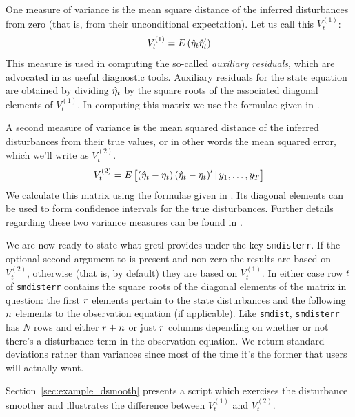One measure of variance is the mean square distance of the inferred
disturbances from zero (that is, from their unconditional
expectation). Let us call this $V^{(1)}_t$:
\[
V^{(1)}_t = E\left(\hat{\eta}_t\hat{\eta}_t'\right)
\]
This measure is used in computing the so-called \emph{auxiliary
  residuals}, which are advocated in \cite{durbin-koopman12} as useful
diagnostic tools. Auxiliary residuals for the state equation are
obtained by dividing $\hat{\eta}_t$ by the square roots of the
associated diagonal elements of $V^{(1)}_t$. In computing this matrix
we use the formulae given in \citet[section 4.4]{koopman-etal99}.

A second measure of variance is the mean squared distance of the
inferred disturbances from their true values, or in other words the
mean squared error, which we'll write as $V^{(2)}_t$.
\[
V^{(2)}_t = E\left[\left(\hat{\eta}_t - \eta_t\right)
  \left(\hat{\eta}_t - \eta_t\right)'
  | \,y_1, \ldots, y_T \right]
\]
We calculate this matrix using the formulae given in \citet[section
  4.5.2]{durbin-koopman12}. Its diagonal elements can be used to form
confidence intervals for the true disturbances. Further details
regarding these two variance measures can be found in \cite{cottrell16}.

We are now ready to state what gretl provides under the key
\texttt{smdisterr}. If the optional second argument to 
is present and non-zero the results are based on $V^{(2)}_t$,
otherwise (that is, by default) they are based on $V^{(1)}_t$. In
either case row $t$ of \texttt{smdisterr} contains the square roots of
the diagonal elements of the matrix in question: the first $r$
elements pertain to the state disturbances and the following $n$
elements to the observation equation (if applicable). Like
\texttt{smdist}, \texttt{smdisterr} has $N$ rows and either
$r + n$ or just $r$ columns depending on whether or
not there's a disturbance term in the observation equation. We return
standard deviations rather than variances since most of the time it's
the former that users will actually want.

Section~\ref{sec:example_dsmooth} presents a script which exercises
the disturbance smoother and illustrates the difference between
$V^{(1)}_t$ and $V^{(2)}_t$.


